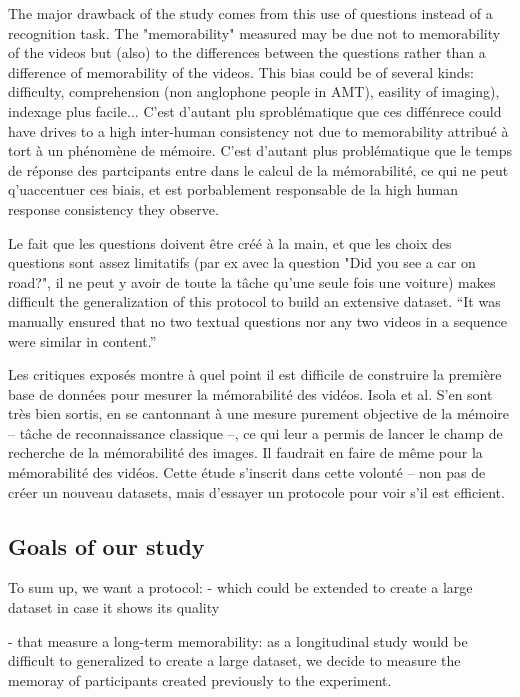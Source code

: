 \documentclass[sigconf]{acmart}
\begin{document}
The major drawback of the study comes from this use of questions instead of a recognition task. The "memorability" measured may be due not to memorability of the videos but (also) to the differences between the questions rather than a difference of memorability of the videos. This bias could be of several kinds: difficulty, comprehension (non anglophone people in AMT), easility of imaging), indexage plus facile... C'est d'autant plu sproblématique que ces diffénrece could have drives to a high inter-human consistency not due to memorability attribué à tort à un phénomène de mémoire. C'est d'autant plus problématique que le temps de réponse des partcipants entre dans le calcul de la mémorabilité, ce qui ne peut q'uaccentuer ces biais, et est porbablement responsable de la high human response consistency they observe.


Le fait que les questions doivent être créé à la main, et que les choix des questions sont assez limitatifs (par ex avec la question "Did you see a car on road?", il ne peut y avoir de toute la tâche qu'une seule fois une voiture) makes difficult the generalization of this protocol to build an extensive dataset.
“It was manually ensured that no two textual questions nor any two videos in a sequence were similar in content.” 


Les critiques exposés montre à quel point il est difficile de construire la première base de données pour mesurer la mémorabilité des vidéos. Isola et al. S’en sont très bien sortis, en se cantonnant à une mesure purement objective de la mémoire – tâche de reconnaissance classique –, ce qui leur a permis de lancer le champ de recherche de la mémorabilité des images. Il faudrait en faire de même pour la mémorabilité des vidéos. Cette étude s’inscrit dans cette volonté – non pas de créer un nouveau datasets, mais d’essayer un protocole pour voir s’il est efficient.


\subsection{Goals of our study}
To sum up, we want a protocol:
- which could be extended to create a large dataset in case it shows its quality

- that measure a long-term memorability: as a longitudinal study would be difficult to generalized to create a large dataset, we decide to measure the memoray of participants created previously to the experiment.
\end{document}
